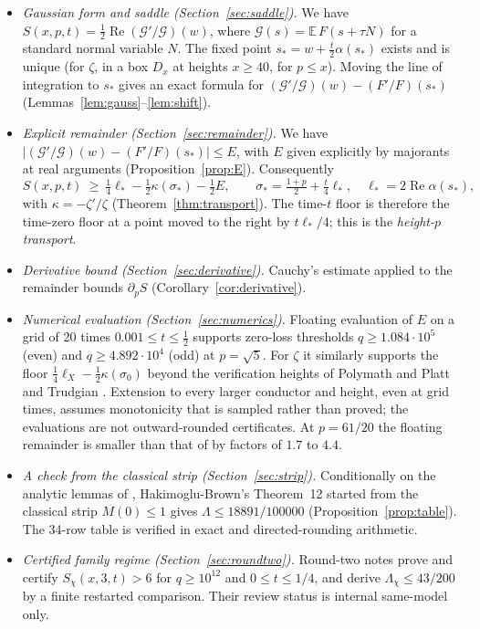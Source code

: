 \documentclass[11pt]{article}
\theoremstyle{definition}
\theoremstyle{remark}
\newcommand{\E}{\mathbb E}
\newcommand{\cG}{\mathcal G}
\newcommand{\re}{\operatorname{Re}}
\numberwithin{equation}{section}
\begin{document}
\begin{itemize}
\item \emph{Gaussian form and saddle (Section~\ref{sec:saddle}).} We have
$S(x,p,t)=\frac12\re(\cG'/\cG)(w)$, where $\cG(s)=\E\,F(s+\tau N)$ for a
standard normal variable $N$. The fixed point $s_*=w+\frac t2\alpha(s_*)$
exists and is unique (for $\zeta$, in a box $D_x$ at heights $x\ge40$,
for $p\le x$). Moving the line of integration to $s_*$ gives an
exact formula for $(\cG'/\cG)(w)-(F'/F)(s_*)$
(Lemmas~\ref{lem:gauss}--\ref{lem:shift}).
\item \emph{Explicit remainder (Section~\ref{sec:remainder}).} We have
$\bigl|(\cG'/\cG)(w)-(F'/F)(s_*)\bigr|\le E$, with $E$ given explicitly
by majorants at real arguments (Proposition~\ref{prop:E}). Consequently
\begin{equation}\label{eq:floorintro}
S(x,p,t)\ \ge\ \tfrac14\ell_*-\tfrac12\kappa(\sigma_*)-\tfrac12E,\qquad
\sigma_*=\tfrac{1+p}2+\tfrac t4\ell_*,\quad\ell_*=2\re\alpha(s_*),
\end{equation}
with $\kappa=-\zeta'/\zeta$ (Theorem~\ref{thm:transport}). The time-$t$
floor is therefore the time-zero floor at a point moved to the right by
$t\ell_*/4$; this is the \emph{height-$p$ transport}.
\item \emph{Derivative bound (Section~\ref{sec:derivative}).} Cauchy's
estimate applied to the remainder bounds $\partial_pS$
(Corollary~\ref{cor:derivative}).
\item \emph{Numerical evaluation (Section~\ref{sec:numerics}).} Floating
evaluation of $E$ on a grid of 20 times $0.001\le t\le\frac12$ supports
zero-loss thresholds $q\ge1.084\cdot10^5$ (even) and
$q\ge4.892\cdot10^4$ (odd) at $p=\sqrt5$. For $\zeta$ it similarly
supports the floor $\frac14\ell_X-\frac12\kappa(\sigma_0)$ beyond the
verification heights of Polymath \cite{polymath} and Platt and Trudgian
\cite{platttrudgian}. Extension to every larger conductor and height,
even at grid times, assumes monotonicity that is sampled rather than
proved; the evaluations are not outward-rounded certificates. At $p=61/20$ the floating remainder is
smaller than that of \cite[Proposition~11]{hb} by factors of $1.7$ to $4.4$.
\item \emph{A check from the classical strip
(Section~\ref{sec:strip}).} Conditionally on the analytic lemmas of
\cite{hb}, Hakimoglu-Brown's Theorem~12 started from the classical strip
$M(0)\le1$ gives $\Lambda\le18891/100000$ (Proposition~\ref{prop:table}).
The 34-row table is verified in exact and directed-rounding arithmetic.
\item \emph{Certified family regime (Section~\ref{sec:roundtwo}).}
Round-two notes \cite{r2floor,r2consumer} prove and certify
$S_\chi(x,3,t)>6$ for $q\ge10^{12}$ and $0\le t\le1/4$, and derive
$\Lambda_\chi\le43/200$ by a finite restarted comparison. Their
review status is internal same-model only.
\end{itemize}
\end{document}
